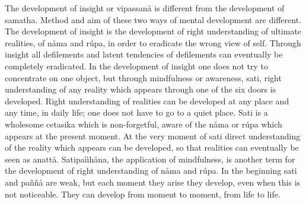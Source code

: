 \documentclass[12pt,twoside]{article}
\begin{document}
The development of insight or vipassan{\aa} is different from the
development of samatha. Method and aim of these two ways of mental
development are different. The development of insight is the
development of right understanding of ultimate realities, of n{\aa}ma
and r\'upa, in order to eradicate the wrong view of self. Through
insight all defilements and latent tendencies of defilements can
eventually be completely eradicated. In the development of insight one
does not try to concentrate on one object, but through mindfulness or
awareness, sati, right understanding of any reality which appears
through one of the six doors is developed. Right understanding of
realities can be developed at any place and any time, in daily life;
one does not have to go to a quiet place. Sati is a wholesome cetasika
which is non{}-forgetful, aware of the n{\aa}ma or r\'upa which appears
at the present moment. At the very moment of sati direct understanding
of the reality which appears can be developed, so that realities can
eventually be seen as anatt{\aa}. Satipa\`i\`ih{\aa}na, the application
of mindfulness, is another term for the development of right
understanding of n{\aa}ma and r\'upa. In the beginning sati and
pa\~n\~n{\aa} are weak, but each moment they arise they develop, even
when this is not noticeable. They can develop from moment to moment,
from life to life. 
\end{document}
